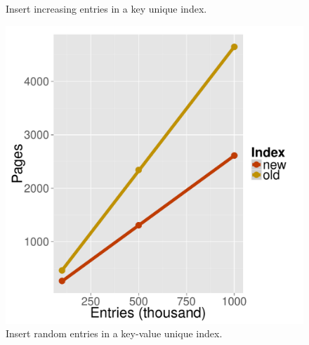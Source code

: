\documentclass[11pt,a4paper,oneside]{article}
\begin{document}
\begin{figure}
{\begin{minipage}{0.3\textwidth}
      \caption{Insert increasing entries in a key unique index.}
      \label{fig:unique_increasing_insert_numNodes}
      \end{minipage}
      \hspace{0.05\textwidth}
      \begin{minipage}{0.3\textwidth}
      \includegraphics[scale=0.30]{images/nonunique_random_insert_numNodes.pdf} 
      \caption{Insert random entries in a key-value unique index.}
      \label{fig:nonunique_random_insert_numNodes}
      \end{minipage}
    }
\end{figure}
\end{document}
